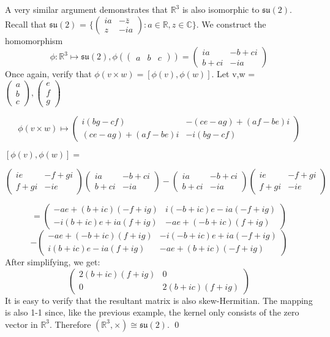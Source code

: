 \documentclass{article}
\begin{document}
\newpage
A very similar argument demonstrates that $\mathbb{R}^3$ is also isomorphic to $\mathfrak{su}(2)$.
Recall that $\mathfrak{su}(2)$ = $\{\begin{pmatrix}ia&-\bar{z}\\z&-ia\end{pmatrix}:a\in\mathbb{R},z\in \mathbb{C}\}$.
We construct the homomorphism
\[
\phi: \mathbb{R}^3 \mapsto \mathfrak{su}(2), \phi(\begin{pmatrix}a&b&c\end{pmatrix}) = \begin{pmatrix}ia & -b+ci\\b+ci & -ia\end{pmatrix}
\]
Once again, verify that $\phi(v\times w) = [\phi(v),\phi(w)]$. Let v,w = $\begin{pmatrix}a\\b\\c\end{pmatrix},\begin{pmatrix}e\\f\\g\end{pmatrix}$

\[
\phi(v\times w) \mapsto \begin{pmatrix}i(bg-cf)&-(ce-ag)+(af-be)i\\(ce-ag)+(af-be)i&-i(bg-cf)\end{pmatrix}
\]
\begin{center}
$[\phi(v),\phi(w)] =$ 
\end{center}
\[
\begin{pmatrix}ie&-f+gi\\f+gi&-ie\end{pmatrix}\begin{pmatrix}ia&-b+ci\\b+ci&-ia\end{pmatrix} - \begin{pmatrix}ia&-b+ci\\b+ci&-ia\end{pmatrix}\begin{pmatrix}ie&-f+gi\\f+gi&-ie\end{pmatrix}
\]

\[
= \begin{pmatrix}
-a e + (b + i c) (-f + i g) & i (-b + i c) e - i a (-f + i g) \\
-i (b + i c) e + i a (f + i g) & -a e + (-b + i c) (f + i g)
\end{pmatrix}
\]
\[
- \begin{pmatrix}-a e + (-b + i c) (f + i g) & -i (-b + i c) e + i a (-f + i g) \\
i (b + i c) e - i a (f + i g) & -a e + (b + i c) (-f + i g)\end{pmatrix}
\]
After simplifying, we get:
\[
\begin{pmatrix}
2(b+ic)(f+ig) & 0 \\
0 & 2(b+ic)(f+ig)
\end{pmatrix}
\]
It is easy to verify that the resultant matrix is also skew-Hermitian. The mapping is also 1-1 since, like the previous example, the kernel only consists of the zero vector in $\mathbb{R}^3$. Therefore $(\mathbb{R}^3,\times)\cong \mathfrak{su}(2)$. \qed
\end{document}
